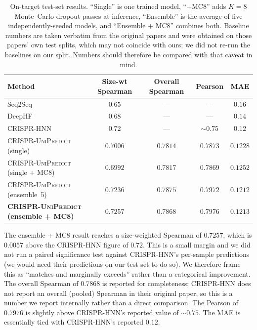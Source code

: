 \documentclass[11pt,a4paper]{article}
\begin{document}
\begin{table}[h]
\centering
\caption{On-target test-set results. ``Single'' is one trained model, ``+MC8'' adds $K{=}8$ Monte~Carlo dropout passes at inference, ``Ensemble'' is the average of five independently-seeded models, and ``Ensemble + MC8'' combines both. Baseline numbers are taken verbatim from the original papers and were obtained on those papers' own test splits, which may not coincide with ours; we did not re-run the baselines on our split. Numbers should therefore be compared with that caveat in mind.}
\label{tab:ontarget}
\small
\begin{tabular}{lcccc}
\toprule
Method & Size-wt Spearman & Overall Spearman & Pearson & MAE \\
\midrule
Seq2Seq~\citep{seq2seq_sgrna}             & $0.65$ & --- & --- & $0.16$ \\
DeepHF~\citep{deephf}                     & $0.68$ & --- & --- & $0.14$ \\
CRISPR-HNN~\citep{crispr_hnn}             & $0.72$ & --- & $\sim 0.75$ & $0.12$ \\
\midrule
\textsc{CRISPR-UniPredict} (single)       & $0.7006$ & $0.7814$ & $0.7873$ & $0.1228$ \\
\textsc{CRISPR-UniPredict} (single + MC8) & $0.6992$ & $0.7817$ & $0.7869$ & $0.1252$ \\
\textsc{CRISPR-UniPredict} (ensemble~5)   & $0.7236$ & $0.7875$ & $0.7972$ & $0.1212$ \\
\textbf{\textsc{CRISPR-UniPredict} (ensemble + MC8)} & $\mathbf{0.7257}$ & $\mathbf{0.7868}$ & $\mathbf{0.7976}$ & $\mathbf{0.1213}$ \\
\bottomrule
\end{tabular}
\end{table}

The ensemble + MC8 result reaches a size-weighted Spearman of $0.7257$, which is $0.0057$ above the CRISPR-HNN figure of $0.72$. This is a small margin and we did not run a paired significance test against CRISPR-HNN's per-sample predictions (we would need their predictions on our test set to do so). We therefore frame this as ``matches and marginally exceeds'' rather than a categorical improvement. The overall Spearman of $0.7868$ is reported for completeness; CRISPR-HNN does not report an overall (pooled) Spearman in their original paper, so this is a number we report internally rather than a direct comparison. The Pearson of $0.7976$ is slightly above CRISPR-HNN's reported value of $\sim 0.75$. The MAE is essentially tied with CRISPR-HNN's reported $0.12$.
\end{document}
